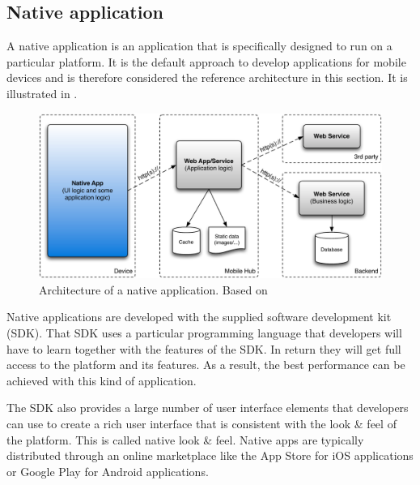\subsection{Native application}

A native application is an application that is specifically designed to run on a particular platform. It is the default approach to develop applications for mobile devices and is therefore considered the reference architecture in this section. It is illustrated in . 

\begin{figure}[h]
    \begin{center}
        \includegraphics[width=\textwidth]{../resources/figs/native.pdf}
        \caption{Architecture of a native application. Based on \cite{Friese}}
        \label{fig:native}
    \end{center}
\end{figure}

Native applications are developed with the supplied software development kit (SDK). That SDK uses a particular programming language that developers will have to learn together with the features of the SDK. In return they will get full access to the platform and its features. As a result, the best performance can be achieved with this kind of application.

The SDK also provides a large number of user interface elements that developers can use to create a rich user interface that is consistent with the look \& feel of the platform. This is called native look \& feel. Native apps are typically distributed through an online marketplace like the App Store for iOS applications or Google Play for Android applications. 


